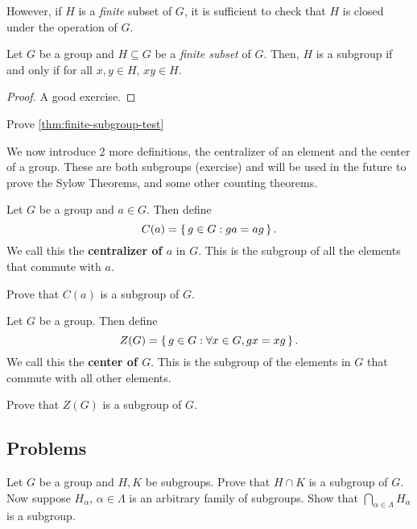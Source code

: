 \documentclass[./main.tex]{subfiles}
\begin{document}
However, if $H$ is a \emph{finite} subset of $G$, it is sufficient to check that
$H$ is closed under the operation of $G$. 
\begin{theorem}
\label{thm:finite-subgroup-test}
    Let $G$ be a group and $H \subseteq G$ be a \emph{finite subset} of $G$.
    Then, $H$ is a subgroup if and only if for all $x,y \in H$, $xy \in H$.
\end{theorem}
\begin{proof}
    A good exercise.
\end{proof}
\begin{exercise}
    Prove \cref{thm:finite-subgroup-test}
\end{exercise}

We now introduce 2 more definitions, the centralizer of an element and the
center of a group. These are both subgroups (exercise) and will be used in the
future to prove the Sylow Theorems, and some other counting theorems.

\begin{definition}[Centralizer]
    Let $G$ be a group and $a \in G$. Then define 
    \[
        C(a) = \set{g \in G: ga=ag}.
    \]
    We call this the \textbf{centralizer of $a$} in $G$. This is the subgroup of
    all the elements that commute with $a$. 
\end{definition}
\begin{exercise}
    Prove that $C(a)$ is a subgroup of $G$. 
\end{exercise}

\begin{definition}
    Let $G$ be a group. Then define 
    \[
        Z(G) = \set{g \in G: \forall x \in G, gx = xg}.
    \]
    We call this the \textbf{center of $G$}. This is the subgroup of the
    elements in $G$ that commute with all other elements.
\end{definition}
\begin{exercise}
    Prove that $Z(G)$ is a subgroup of $G$.
\end{exercise}




\subsection{Problems}

\begin{exercise}
    Let $G$ be a group and $H, K$ be subgroups. Prove that $H \cap K$ is a
    subgroup of $G$. Now suppose $H_{\alpha}$, $\alpha \in \Lambda$ is an
    arbitrary family of subgroups. Show that $\bigcap_{\alpha \in \Lambda}
    H_\alpha$ is a subgroup.
\end{exercise}
\end{document}
